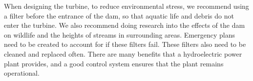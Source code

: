 \documentclass{article}
\begin{document}
\begin{multicols*}{2}
        When designing the turbine, to reduce environmental stress, we recommend using a filter before the entrance of the dam, so that aquatic life and debris do not enter the turbine. We also recommend doing research into the effects of the dam on wildlife and the heights of streams in surrounding areas. Emergency plans need to be created to account for if these filters fail. These filters also need to be cleaned and replaced often.
        There are many benefits that a hydroelectric power plant provides, and a good control system ensures that the plant remains operational.


    \end{multicols*}
    \pagebreak
    \nocite{*}
    \printbibliography
\end{document}
